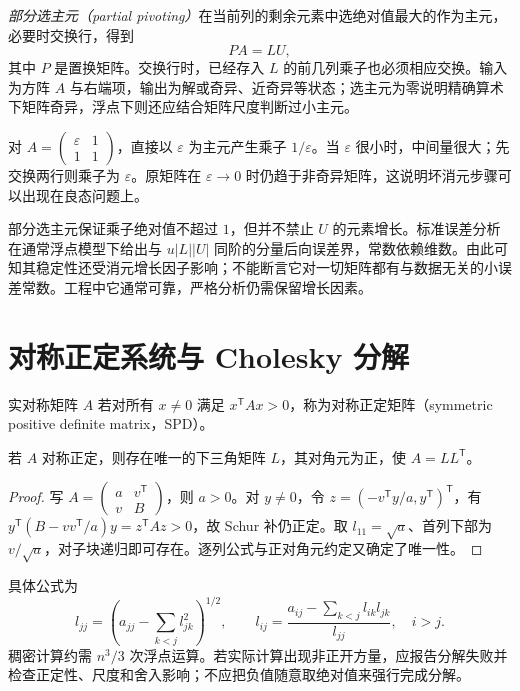 \documentclass[UTF8,12pt,a4paper,fontset=fandol]{ctexbook}
\begin{document}
\emph{部分选主元（partial pivoting）}在当前列的剩余元素中选绝对值最大的作为主元，必要时交换行，得到
\begin{equation}
 PA=LU,
 \label{eq:na-plu}
\end{equation}
其中 $P$ 是置换矩阵。交换行时，已经存入 $L$ 的前几列乘子也必须相应交换。输入为方阵 $A$ 与右端项，输出为解或奇异、近奇异等状态；选主元为零说明精确算术下矩阵奇异，浮点下则还应结合矩阵尺度判断过小主元。

\begin{example}[小主元引起的中间量放大]
对 $A=\begin{pmatrix}\varepsilon&1\\1&1\end{pmatrix}$，直接以 $\varepsilon$ 为主元产生乘子 $1/\varepsilon$。当 $\varepsilon$ 很小时，中间量很大；先交换两行则乘子为 $\varepsilon$。原矩阵在 $\varepsilon\to0$ 时仍趋于非奇异矩阵，这说明坏消元步骤可以出现在良态问题上。
\end{example}

部分选主元保证乘子绝对值不超过 $1$，但并不禁止 $U$ 的元素增长。标准误差分析在通常浮点模型下给出与 $u|L||U|$ 同阶的分量后向误差界，常数依赖维数。由此可知其稳定性还受消元增长因子影响；不能断言它对一切矩阵都有与数据无关的小误差常数。工程中它通常可靠，严格分析仍需保留增长因素。

\section{对称正定系统与 Cholesky 分解}
\begin{definition}[对称正定矩阵]
实对称矩阵 $A$ 若对所有 $x\ne0$ 满足 $x^{\mathsf T}Ax>0$，称为对称正定矩阵（symmetric positive definite matrix，SPD）。
\end{definition}
\begin{theorem}[Cholesky 分解]
若 $A$ 对称正定，则存在唯一的下三角矩阵 $L$，其对角元为正，使 $A=LL^{\mathsf T}$。
\end{theorem}
\begin{proof}
写 $A=\begin{pmatrix}a&v^{\mathsf T}\\v&B\end{pmatrix}$，则 $a>0$。对 $y\ne0$，令 $z=(-v^{\mathsf T}y/a,y^{\mathsf T})^{\mathsf T}$，有 $y^{\mathsf T}(B-vv^{\mathsf T}/a)y=z^{\mathsf T}Az>0$，故 Schur 补仍正定。取 $l_{11}=\sqrt a$、首列下部为 $v/\sqrt a$，对子块递归即可存在。逐列公式与正对角元约定又确定了唯一性。
\end{proof}
具体公式为
\[
 l_{jj}=\left(a_{jj}-\sum_{k<j}l_{jk}^2\right)^{1/2},\qquad
 l_{ij}=\frac{a_{ij}-\sum_{k<j}l_{ik}l_{jk}}{l_{jj}},\quad i>j.
\]
稠密计算约需 $n^3/3$ 次浮点运算。若实际计算出现非正开方量，应报告分解失败并检查正定性、尺度和舍入影响；不应把负值随意取绝对值来强行完成分解。
\end{document}
